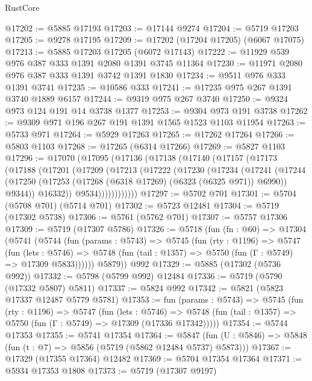 \begin{lexlean}{RustCore}
\begin{coremodule}
@17202 := @5885 @17193
@17203 := @17144 @9274
@17204 := @5719 @17203
@17205 := @9278 @17195
@17209 := @17202 (@17204 @17205) (@6067 @17075)
@17213 := @5885 @17203 @17205 (@6072 @17143)
@17222 := @11929 @539 @976 @387 @333 @1391 @2080 @1391 @3745 @11364
@17230 := @11971 @2080 @976 @387 @333 @1391 @3742 @1391 @1830
@17234 := @9511 @976 @333 @1391 @3741
@17235 := @10586 @333
@17241 := @17235 @975 @267 @1391 @3740 @1889 @6157
@17244 := @9319 @975 @267 @3740
@17250 := @9324 @973 @124 @191 @14 @3738 @1377
@17253 := @9304 @973 @191 @3738
@17262 := @9309 @971 @196 @267 @191 @1391 @1565 @1523 @1103 @11954
@17263 := @5733 @971
@17264 := @5929 @17263
@17265 := @17262 @17264
@17266 := @5803 @1103
@17268 := @17265 (@6314 @17266)
@17269 := @5827 @1103
@17296 := @17070
    (@17095
      (@17136
        (@17138
          (@17140
            (@17157
              (@17173
                (@17188
                  (@17201
                    (@17209
                      (@17213
                        (@17222
                          (@17230
                            (@17234
                              (@17241
                                (@17244
                                  (@17250
                                    (@17253 (@17268 (@6318 @17269) (@6323 (@6325 @971)) @6990))
                                    @9344))
                                @16332))
                            @9534))))))))))))
@17297 := @5702 @701
@17301 := @5704 (@5708 @701) (@5714 @701)
@17302 := @5723 @12481
@17304 := @5719 (@17302 @5738)
@17306 := @5761 (@5762 @701)
@17307 := @5757 @17306
@17309 := @5719 (@17307 @5786)
@17326 := @5718
    (fun (fn : @60) =>
    @17304
      (@5741
        (@5744
          (fun (params : @5743) =>
          @5745
            (fun (rty : @1196) =>
            @5747
              (fun (lets : @5746) =>
              @5748 (fun (tail : @1357) => @5750 (fun (Γ : @5749) => @17309 @5833))))))
        @5879))
    @992
@17329 := @5885 (@17302 (@5736 @992))
@17332 := @5798 (@5799 @992) @12484
@17336 := @5719 (@5790 (@17332 @5807) @5811)
@17337 := @5824 @992
@17342 := @5821 (@5823 @17337 @12487 @5779 @5781)
@17353 := fun (params : @5743) =>
  @5745
    (fun (rty : @1196) =>
    @5747
      (fun (lets : @5746) =>
      @5748 (fun (tail : @1357) => @5750 (fun (Γ : @5749) => @17309 (@17336 @17342)))))
@17354 := @5744 @17353
@17355 := @5741 @17354
@17364 := @5847
    (fun (U : @5846) => @5848 (fun (t : @7) => @5856 (@5719 (@5862 @12484 @5737) @5873)))
@17367 := @17329 (@17355 @17364) @12482
@17369 := @5704 @17354 @17364
@17371 := @5934 @17353 @1808
@17373 := @5719 (@17307 @9197)

\end{coremodule}
\end{lexlean}
